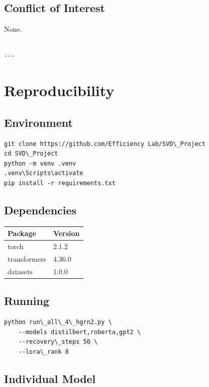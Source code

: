 \subsection{Conflict of Interest}

None.
\begin{lstlisting}

---
\end{lstlisting}

\section{Reproducibility}

\subsection{Environment}

\begin{lstlisting}
git clone https://github.com/Efficiency Lab/SVD\_Project
cd SVD\_Project
python -m venv .venv
.venv\Scripts\activate
pip install -r requirements.txt
\end{lstlisting}

\subsection{Dependencies}

\begin{table}[H]
\centering
\small
\begin{tabular}{ll}
\toprule
\textbf{Package} & \textbf{Version} \\
\midrule
torch & 2.1.2 \\
transformers & 4.36.0 \\
datasets & 1.0.0 \\
\bottomrule
\end{tabular}
\end{table}

\subsection{Running}

\begin{lstlisting}
python run\_all\_4\_hgrn2.py \
    --models distilbert,roberta,gpt2 \
    --recovery\_steps 50 \
    --lora\_rank 8
\end{lstlisting}

\subsection{Individual Model}


